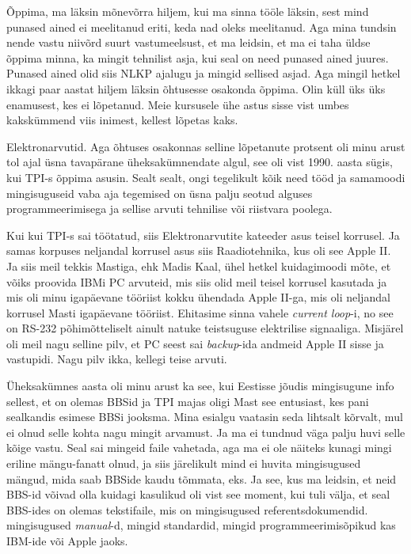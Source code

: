 
Õppima, ma läksin mõnevõrra hiljem, kui ma sinna tööle läksin, sest mind punased ained ei  meelitanud eriti, keda nad oleks meelitanud. Aga mina tundsin nende vastu niivõrd suurt vastumeelsust,  et ma leidsin, et ma ei taha  üldse õppima minna, ka mingit tehnilist asja, kui seal on need punased ained juures. Punased ained olid siis  NLKP ajalugu ja mingid sellised asjad. Aga mingil hetkel ikkagi paar aastat hiljem läksin õhtusesse osakonda õppima. Olin küll üks  üks enamusest, kes ei lõpetanud. Meie kursusele ühe astus sisse vist umbes kakskümmend viis inimest, kellest lõpetas kaks. 


Elektronarvutid. Aga õhtuses osakonnas selline lõpetanute protsent oli minu arust tol ajal üsna tavapärane üheksakümnendate algul, see oli vist 1990. aasta sügis, kui TPI-s õppima asusin. Sealt sealt, ongi tegelikult kõik need tööd ja samamoodi mingisuguseid vaba aja tegemised on üsna palju seotud alguses  programmeerimisega ja sellise arvuti tehnilise või riistvara poolega.

Kui kui TPI-s sai töötatud, siis Elektronarvutite kateeder asus teisel korrusel. Ja samas korpuses neljandal korrusel asus siis Raadiotehnika, kus oli see Apple II. Ja siis meil tekkis Mastiga, ehk Madis Kaal, ühel hetkel kuidagimoodi mõte, et võiks proovida IBMi PC arvuteid, mis siis olid meil teisel korrusel kasutada ja mis oli minu igapäevane tööriist kokku ühendada  Apple II-ga, mis oli neljandal korrusel Masti igapäevane tööriist. Ehitasime sinna vahele \emph{current loop}-i, no see on RS-232 põhimõtteliselt ainult natuke teistsuguse elektrilise signaaliga. Misjärel oli meil nagu selline pilv, et PC seest sai \emph{backup}-ida  andmeid Apple II sisse ja vastupidi. Nagu pilv ikka, kellegi teise arvuti. 

Üheksakümnes aasta oli minu arust ka see, kui Eestisse jõudis mingisugune info sellest, et on olemas BBSid ja TPI majas oligi Mast  see entusiast, kes pani sealkandis esimese BBSi jooksma. Mina esialgu vaatasin seda lihtsalt kõrvalt, mul ei olnud selle kohta nagu mingit arvamust. Ja ma ei tundnud  väga palju huvi selle kõige vastu. Seal sai mingeid faile vahetada, aga  ma ei ole näiteks kunagi mingi eriline mängu-fanatt olnud, ja siis järelikult mind ei huvita  mingisugused mängud, mida saab BBSide kaudu tõmmata, eks. Ja see, kus ma leidsin, et neid BBS-id võivad olla kuidagi kasulikud  oli vist see moment, kui tuli välja, et seal BBS-ides on olemas  tekstifaile, mis on mingisugused referentsdokumendid. mingisugused \emph{manual}-d, mingid standardid, mingid programmeerimisõpikud kas IBM-ide või Apple jaoks.

